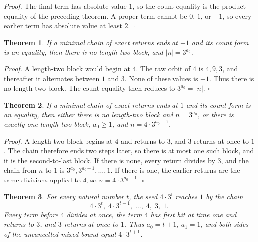 \documentclass[11pt,letterpaper]{article}
\newtheorem{theorem}{Theorem}
\newenvironment{proof}{\noindent\textit{Proof.}}{\hfill\(\square\)}
\begin{document}
\begin{proof}
The final term has absolute value \(1\), so the count equality is the product equality of the preceding theorem. A proper term cannot be \(0\), \(1\), or \(-1\), so every earlier term has absolute value at least \(2\).
\end{proof}

\begin{theorem}
\label{thm:negpower}
If a minimal chain of exact returns ends at \(-1\) and its count form is an equality, then there is no length-two block, and \(|n|=3^{a_{0}}\).
\end{theorem}

\begin{proof}
A length-two block would begin at \(4\). The raw orbit of \(4\) is \(4,9,3\), and thereafter it alternates between \(1\) and \(3\). None of these values is \(-1\). Thus there is no length-two block. The count equality then reduces to \(3^{a_{0}}=|n|\).
\end{proof}

\begin{theorem}
\label{thm:oneshape}
If a minimal chain of exact returns ends at \(1\) and its count form is an equality, then either there is no length-two block and \(n=3^{a_{0}}\), or there is exactly one length-two block, \(a_{0}\ge 1\), and \(n=4\cdot 3^{a_{0}-1}\).
\end{theorem}

\begin{proof}
A length-two block begins at \(4\) and returns to \(3\), and \(3\) returns at once to \(1\). The chain therefore ends two steps later, so there is at most one such block, and it is the second-to-last block. If there is none, every return divides by \(3\), and the chain from \(n\) to \(1\) is \(3^{a_{0}},3^{a_{0}-1},\ldots,1\). If there is one, the earlier returns are the same divisions applied to \(4\), so \(n=4\cdot 3^{a_{0}-1}\).
\end{proof}

\begin{theorem}
\label{thm:mixedpower}
For every natural number \(t\), the seed \(4\cdot 3^{t}\) reaches \(1\) by the chain
\[
4\cdot 3^{t},\; 4\cdot 3^{t-1},\; \ldots,\; 4,\; 3,\; 1.
\]
Every term before \(4\) divides at once, the term \(4\) has first hit at time one and returns to \(3\), and \(3\) returns at once to \(1\). Thus \(a_{0}=t+1\), \(a_{1}=1\), and both sides of the uncancelled mixed bound equal \(4\cdot3^{t+1}\).
\end{theorem}
\end{document}

